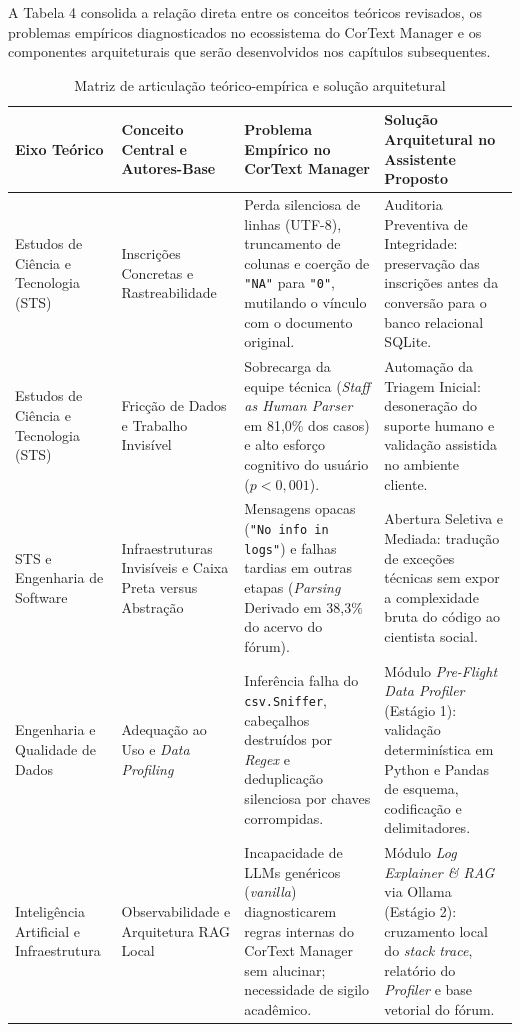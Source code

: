 \documentclass[
	oneside,
	a4paper,
	12pt,
	chapter=TITLE,
	section=TITLE,
	english,
	brazilian
]{abntex2}
\begin{document}
A Tabela 4 consolida a relação direta entre os conceitos teóricos revisados, os problemas empíricos diagnosticados no ecossistema do CorText Manager e os componentes arquiteturais que serão desenvolvidos nos capítulos subsequentes.

\begin{table}[htb]
  \caption{Matriz de articulação teórico-empírica e solução arquitetural}
  \label{tab:tabela_4}
  \centering
  \small
  \setlength{\tabcolsep}{4pt}
  \begin{tabularx}{\textwidth}{|>{\raggedright\arraybackslash}p{3.2cm}|>{\raggedright\arraybackslash}X|>{\raggedright\arraybackslash}X|>{\raggedright\arraybackslash}X|}
    \hline
    \textbf{Eixo Teórico} & \textbf{Conceito Central e Autores-Base} & \textbf{Problema Empírico no CorText Manager} & \textbf{Solução Arquitetural no Assistente Proposto} \\ \hline
    Estudos de Ciência e Tecnologia (STS) & Inscrições Concretas e Rastreabilidade \cite{Abdo2021,Kitchin2014,Gitelman2013} & Perda silenciosa de linhas (UTF-8), truncamento de colunas e coerção de \texttt{"NA"} para \texttt{"0"}, mutilando o vínculo com o documento original. & Auditoria Preventiva de Integridade: preservação das inscrições antes da conversão para o banco relacional SQLite. \\ \hline
    Estudos de Ciência e Tecnologia (STS) & Fricção de Dados e Trabalho Invisível \cite{Edwards2010,DIgnazio2020} & Sobrecarga da equipe técnica (\textit{Staff as Human Parser} em 81,0\% dos casos) e alto esforço cognitivo do usuário ($p < 0,001$). & Automação da Triagem Inicial: desoneração do suporte humano e validação assistida no ambiente cliente. \\ \hline
    STS e Engenharia de Software & Infraestruturas Invisíveis e Caixa Preta versus Abstração \cite{Bowker1999,Latour1987,Parnas1972,Norman2013} & Mensagens opacas (\texttt{"No info in logs"}) e falhas tardias em outras etapas (\textit{Parsing} Derivado em 38,3\% do acervo do fórum). & Abertura Seletiva e Mediada: tradução de exceções técnicas sem expor a complexidade bruta do código ao cientista social. \\ \hline
    Engenharia e Qualidade de Dados & Adequação ao Uso e \textit{Data Profiling} \cite{Wang1996,Naumann2014,Abedjan2015,Batini2016} & Inferência falha do \texttt{csv.\allowbreak Sniffer}, cabeçalhos destruídos por \textit{Regex} e deduplicação silenciosa por chaves corrompidas. & Módulo \textit{Pre-Flight Data Profiler} (Estágio 1): validação determinística em Python e Pandas de esquema, codificação e delimitadores. \\ \hline
    Inteligência Artificial e Infraestrutura & Observabilidade e Arquitetura RAG Local \cite{Majors2022,Lewis2020,Gao2023,Bender2021} & Incapacidade de LLMs genéricos (\textit{vanilla}) diagnosticarem regras internas do CorText Manager sem alucinar; necessidade de sigilo acadêmico. & Módulo \textit{Log Explainer \& RAG} via Ollama (Estágio 2): cruzamento local do \textit{stack trace}, relatório do \textit{Profiler} e base vetorial do fórum. \\ \hline
  \end{tabularx}
\end{table}
\end{document}
